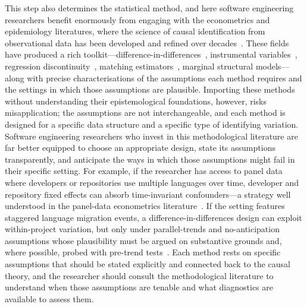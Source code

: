 This step also determines the statistical method, and here software engineering researchers benefit enormously from engaging with the econometrics and epidemiology literatures, where the science of causal identification from observational data has been developed and refined over decades~\cite{angrist1996identification,rosenbaum2002observational,pearl2009causality,cunningham2021causal,hansen2022econometrics}.
These fields have produced a rich toolkit---difference-in-differences~\cite{card1993minimum,roth2023s}, instrumental variables~\cite{angrist1996identification}, regression discontinuity~\cite{thistlethwaite1960regression,calonico2014robust}, matching estimators~\cite{rosenbaum1983central,caliendo2008some}, marginal structural models---along with precise characterisations of the assumptions each method requires and the settings in which those assumptions are plausible.
Importing these methods without understanding their epistemological foundations, however, risks misapplication; the assumptions are not interchangeable, and each method is designed for a specific data structure and a specific type of identifying variation.
Software engineering researchers who invest in this methodological literature are far better equipped to choose an appropriate design, state its assumptions transparently, and anticipate the ways in which those assumptions might fail in their specific setting.
For example, if the researcher has access to panel data where developers or repositories use multiple languages over time, developer and repository fixed effects can absorb time-invariant confounders---a strategy well understood in the panel-data econometrics literature~\cite{baltagi2008econometric}.
If the setting features staggered language migration events, a difference-in-differences design can exploit within-project variation, but only under parallel-trends and no-anticipation assumptions whose plausibility must be argued on substantive grounds and, where possible, probed with pre-trend tests~\cite{roth2023s,marcus2021role}.
Each method rests on specific assumptions that should be stated explicitly and connected back to the causal theory, and the researcher should consult the methodological literature to understand when those assumptions are tenable and what diagnostics are available to assess them.

